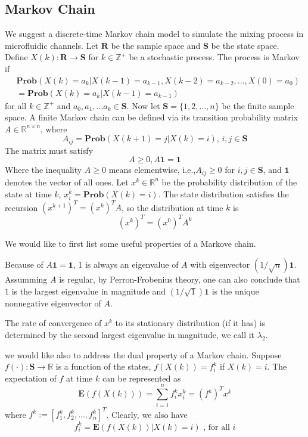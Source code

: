 \subsection{Markov Chain}
We suggest a discrete-time Markov chain model to simulate the mixing process in microfluidic channels. Let $\mathbf{R}$ be the sample space and $\mathbf{S}$ be the state space. Define $X(k):\mathbf{R} \rightarrow \mathbf{S}$ for $k \in \mathbb{Z}^+$ be a stochastic process. The process is Markov if
\begin{eqnarray*}
 &\mathbf{Prob}(X(k) = a_k | X(k-1) = a_{k-1},X(k-2) = a_{k-2},...,X(0) = a_{0})  \\
 &=\mathbf{Prob}(X(k) = a_k | X(k-1) = a_{k-1})
\end{eqnarray*}
for all $k \in \mathbb{Z}^+$ and $a_0, a_1,...a_k \in \mathbf{S}$. Now let $\mathbf{S}= \{1,2,...,n\}$ be the finite sample space. A finite Markov chain can be defined via its transition probability matrix $A \in \mathbb{R}^{n \times n}$, where
$$ A_{ij} = \mathbf{Prob}(X(k+1) = j | X(k) = i), \, i,j \in \mathbf{S}$$ 
The matrix must satisfy
$$ A \ge 0, A\mathbf{1} = \mathbf{1} $$
Where the inequality $A \ge 0$ means elementwise, i.e.,$ A_{ij} \ge 0$ for $ i,j \in \mathbf{S}$, and $\mathbf{1}$ denotes the vector of all ones. Let $x^k \in \mathbb{R}^n$ be the probability distribution of the state at time $k$, $x_i^k = \mathbf{Prob}(X(k)=i)$. The state distribution satisfies the recursion $(x^{k+1})^T=(x^k)^TA$, so the distribution at time $k$ is
$$ (x^k)^T = (x^0)^{T}A^k$$

We would like to first list some useful properties of a Markove chain.
       
Because of $A\mathbf{1} = \mathbf{1}$, 1 is always an eigenvalue of $A$ with eigenvector $(1/\sqrt{n})\mathbf{1}$. Assumming $A$ is regular, by Perron-Frobenius theory, one can also conclude that $1$ is the largest eigenvalue in magnitude and $(1/\sqrt{1})\mathbf{1}$ is the unique nonnegative eigenvector of $A$.   

The rate of convergence of $x^k$ to its stationary distribution (if it has) is determined by the second largest eigenvalue in magnitude, we call it $\lambda_2$.

we would like also to address the dual property of a Markov chain. Suppose $f(\cdot):\mathbf{S} \rightarrow \mathbb{R}$ is a function of the states, $f\left(X(k)\right) = f_i^k$ if $X(k) = i$. The expectation of $f$ at time $k$ can be represented as
\begin{equation*}
 \mathbf{E}\left(f(X(k))\right) = \sum_{i=1}^n f_i^k x_i^k = (f^k)^T x^k
\end{equation*} 
where $f^k := [f_1^k,f_2^k,...,f_n^k]^T$. Clearly, we also have
\begin{equation*}
 f_i^k = \mathbf{E}\left(f(X(k))|X(k)=i\right) \mbox{ , for all } i
\end{equation*} 


